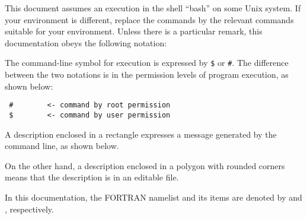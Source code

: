 
This document assumes an execution in the shell ``bash'' on some Unix system.
If your environment is different, replace the commands
by the relevant commands suitable for your environment.
Unless there is a particular remark, this documentation obeys the following notation:

The command-line symbol for execution is expressed by \verb|$| or \verb|#|.
The difference between the two notations is 
in the permission levels of program execution, as shown below:
\begin{verbatim}
 #        <- command by root permission
 $        <- command by user permission
\end{verbatim}

A description enclosed in a rectangle expresses a message generated by the command line, as shown below.

On the other hand, a description enclosed in a polygon with rounded corners means that the description is in an editable file.

In this documentation, the FORTRAN namelist and its items are denoted by
 and , respectively.

